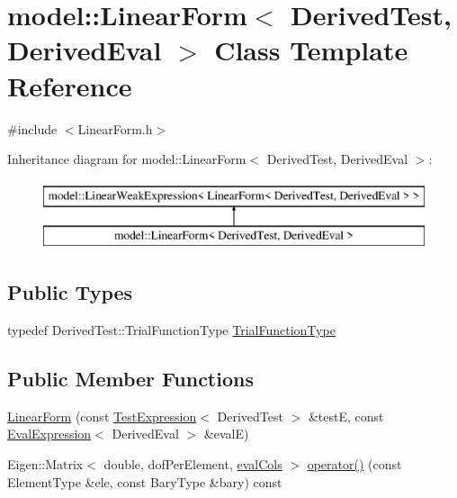 \hypertarget{classmodel_1_1_linear_form}{}\section{model\+:\+:Linear\+Form$<$ Derived\+Test, Derived\+Eval $>$ Class Template Reference}
\label{classmodel_1_1_linear_form}


{\ttfamily \#include $<$Linear\+Form.\+h$>$}

Inheritance diagram for model\+:\+:Linear\+Form$<$ Derived\+Test, Derived\+Eval $>$\+:\begin{figure}[H]
\begin{center}
\leavevmode
\includegraphics[height=2.000000cm]{classmodel_1_1_linear_form}
\end{center}
\end{figure}
\subsection*{Public Types}
\begin{DoxyCompactItemize}
\item 
typedef Derived\+Test\+::\+Trial\+Function\+Type \hyperlink{classmodel_1_1_linear_form_a3b9ee10b33ce5fc4c69b3370704934b8}{Trial\+Function\+Type}
\end{DoxyCompactItemize}
\subsection*{Public Member Functions}
\begin{DoxyCompactItemize}
\item 
\hyperlink{classmodel_1_1_linear_form_a385dbe2849490243c8054063c18d1d3a}{Linear\+Form} (const \hyperlink{structmodel_1_1_test_expression}{Test\+Expression}$<$ Derived\+Test $>$ \&test\+E, const \hyperlink{structmodel_1_1_eval_expression}{Eval\+Expression}$<$ Derived\+Eval $>$ \&eval\+E)
\item 
Eigen\+::\+Matrix$<$ double, dof\+Per\+Element, \hyperlink{classmodel_1_1_linear_form_a0e22c8a17afa5808bdb5b24d439bc098}{eval\+Cols} $>$ \hyperlink{classmodel_1_1_linear_form_afa08d2500a07d13cec6b03562a9af486}{operator()} (const Element\+Type \&ele, const Bary\+Type \&bary) const 
\end{DoxyCompactItemize}
